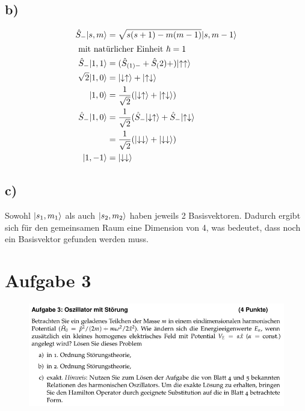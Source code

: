 \subsection{b)}
\begin{align}
    \hat S _- \lvert s,m\rangle &= \sqrt{s(s+1)-m(m-1)}\lvert s,m-1\rangle\\
    \intertext{
        mit natürlicher Einheit $\hbar=1$
    }
    \hat S _- \lvert1,1\rangle &= (\hat S _{(1)-}+\hat S_(2)+) \lvert\uparrow \uparrow\rangle\\
    \sqrt{2} \lvert1,0\rangle &= \lvert\downarrow \uparrow\rangle + \lvert\uparrow \downarrow\rangle\\
    \lvert1,0\rangle &= \frac{1}{\sqrt{2}} (\lvert\downarrow \uparrow\rangle + \lvert\uparrow \downarrow\rangle) \\
    \hat S _- \lvert1,0\rangle &= \frac{1}{\sqrt{2}} (\hat S_- \lvert\downarrow \uparrow\rangle + \hat S _- \lvert\uparrow \downarrow\rangle\\
    &= \frac{1}{\sqrt{2}} (\lvert\downarrow \downarrow\rangle+\lvert\downarrow \downarrow\rangle)\\
    \lvert1,-1\rangle &= \lvert\downarrow \downarrow\rangle
\end{align}
\subsection{c)}

Sowohl $\lvert s_1 ,m_1\rangle $ als auch $\lvert s_2 ,m_2\rangle $ haben jeweils 2 Basisvektoren.
Dadurch ergibt sich für den gemeinsamen Raum eine Dimension von 4, was bedeutet, dass
noch ein Basisvektor gefunden werden muss.

\section{Aufgabe 3}

    \begin{figure}[H]
        \centering
        \includegraphics[width=\textwidth]{images/Aufgabe3.jpg}
        \label{fig:4}
    \end{figure}

